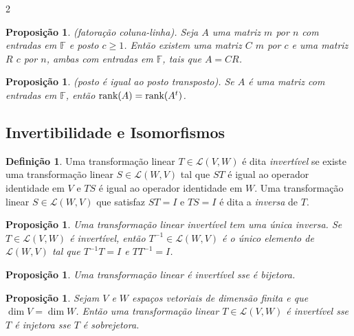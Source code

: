 \documentclass{article}
\theoremstyle{plain}
\newtheorem{prop}[thm]{Proposição}
\theoremstyle{definition}
\newtheorem{defn}{Definição}[section]
\theoremstyle{remark}
\begin{document}
\begin{multicols}{2}
\begin{prop} (fatoração coluna-linha).
    Seja \(A\) uma matriz \(m\) por \(n\) com entradas em \(\mathbb{F}\) e posto \(c \geq 1\). Então existem uma matriz \(C\) \(m\) por \(c\) e uma matriz \(R\) \(c\) por \(n\), ambas com entradas em \(\mathbb{F}\), tais que \(A = CR\).
\end{prop}

\begin{prop} (posto é igual ao posto transposto).
    Se \(A\) é uma matriz com entradas em \(\mathbb{F}\), então \(\textup{rank}(A) = \textup{rank}(A^t)\).
\end{prop}

\subsection{Invertibilidade e Isomorfismos}
\begin{defn}
    Uma transformação linear \(T \in \mathcal{L}(V, W)\) é dita \emph{invertível} se existe uma transformação linear \(S \in \mathcal{L}(W, V)\) tal que \(ST\) é igual ao operador identidade em \(V\) e \(TS\) é igual ao operador identidade em \(W\). Uma transformação linear \(S \in \mathcal{L}(W, V)\) que satisfaz \(ST = I\) e \(TS = I\) é dita a \emph{inversa} de \(T\).
\end{defn}

\begin{prop}
    Uma transformação linear invertível tem uma única inversa. Se \(T \in \mathcal{L}(V, W)\) é invertível, então \(T^{-1} \in \mathcal{L}(W, V)\) é o único elemento de \(\mathcal{L}(W, V)\) tal que \(T^{-1}T = I\) e \(TT^{-1} = I\).
\end{prop}

\begin{prop}
    Uma transformação linear é invertível sse é bijetora.
\end{prop}

\begin{prop}
    Sejam \(V\) e \(W\) espaços vetoriais de dimensão finita e que \(\dim V = \dim W\). Então uma transformação linear \(T \in \mathcal{L}(V, W)\) é invertível sse \(T\) é injetora sse \(T\) é sobrejetora.
\end{prop}


\end{multicols}
\end{document}
